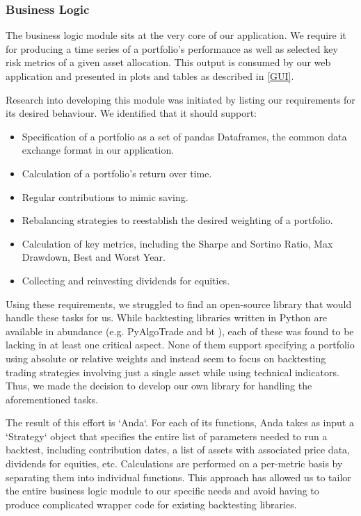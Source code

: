 \documentclass[main.tex]{subfiles}
\begin{document}
\subsubsection{Business Logic}
\label{BL}

The business logic module sits at the very core of our application. We require it for producing a time series of a portfolio's performance as well as selected key risk metrics of a given asset allocation. This output is consumed by our web application and presented in plots and tables as described in \ref{GUI}.

Research into developing this module was initiated by listing our requirements for its desired behaviour. We identified that it should support:

\begin{itemize}
    \item Specification of a portfolio as a set of pandas Dataframes, the common data exchange format in our application.
    \item Calculation of a portfolio's return over time.
    \item Regular contributions to mimic saving.
    \item Rebalancing strategies to reestablish the desired weighting of a portfolio.
    \item Calculation of key metrics, including the Sharpe and Sortino Ratio, Max Drawdown, Best and Worst Year.
    \item Collecting and reinvesting dividends for equities.
\end{itemize}

Using these requirements, we struggled to find an open-source library that would handle these tasks for us. While backtesting libraries written in Python are available in abundance (e.g. PyAlgoTrade \cite{PyAlgoTrade} and bt \cite{bt}), each of these was found to be lacking in at least one critical aspect. None of them support specifying a portfolio using absolute or relative weights and instead seem to focus on backtesting trading strategies involving just a single asset while using technical indicators. Thus, we made the decision to develop our own library for handling the aforementioned tasks.

The result of this effort is `Anda`. For each of its functions, Anda takes as input a `Strategy` object that specifies the entire list of parameters needed to run a backtest, including contribution dates, a list of assets with associated price data, dividends for equities, etc. Calculations are performed on a per-metric basis by separating them into individual functions.
This approach has allowed us to tailor the entire business logic module to our specific needs and avoid having to produce complicated wrapper code for existing backtesting libraries.
\end{document}
